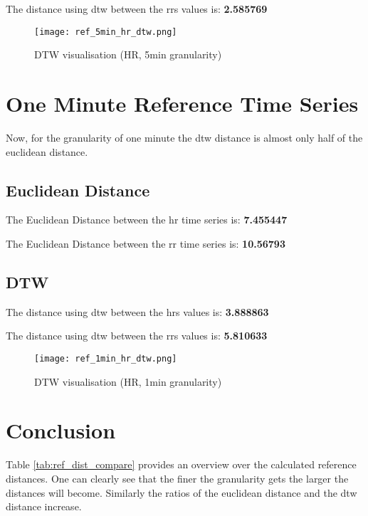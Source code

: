 The distance using \ac{dtw} between the \acp{rr} values is: \textbf{2.585769}

\begin{figure}[h!]
	\texttt{[image: ref\_5min\_hr\_dtw.png]}
	\caption{DTW visualisation (HR, 5min granularity)}
	\label{fig:ref_dtw_dist_5_min_granularity}
\end{figure}






\clearpage
\section{One Minute Reference Time Series}

Now, for the granularity of one minute the \ac{dtw} distance is almost only half of the euclidean distance.

\subsection{Euclidean Distance}

The Euclidean Distance between the \ac{hr} time series is: \textbf{7.455447}


The Euclidean Distance between the \ac{rr} time series is: \textbf{10.56793}


\subsection{DTW}

The distance using \ac{dtw} between the \acp{hr} values is: \textbf{3.888863}


The distance using \ac{dtw} between the \acp{rr} values is: \textbf{5.810633}

\begin{figure}[h!]
	\texttt{[image: ref\_1min\_hr\_dtw.png]}
	\caption{DTW visualisation (HR, 1min granularity)}
	\label{fig:ref_dtw_dist_1_min_granularity}
\end{figure}


\clearpage
\section{Conclusion}

Table \ref{tab:ref_dist_compare} provides an overview over the calculated reference distances. One can clearly see that the finer the granularity gets the larger the distances will become. Similarly the ratios of the euclidean distance and the \ac{dtw} distance increase.

